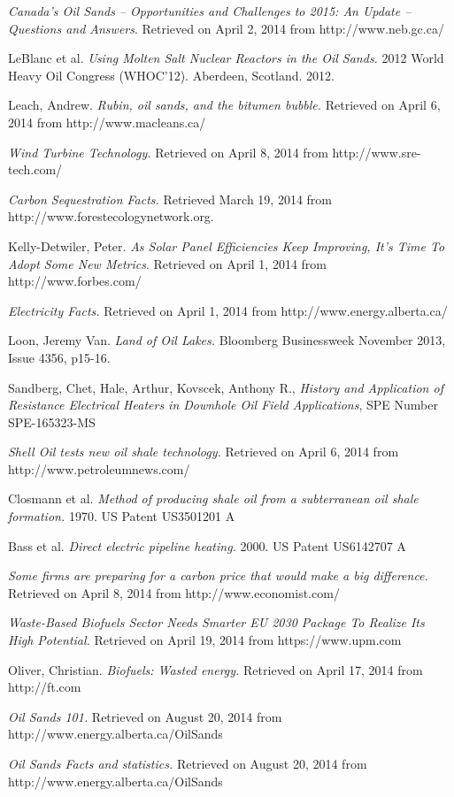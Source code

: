 \documentclass[12pt]{article}
\begin{document}
\begin{thebibliography}{9}
 \emph{Canada’s Oil Sands – Opportunities and Challenges to 2015: An Update – Questions and Answers}. Retrieved on April 2, 2014 from http://www.neb.gc.ca/ 

LeBlanc et al.  \emph{Using Molten Salt Nuclear Reactors in the Oil Sands.} 2012 World Heavy Oil Congress (WHOC’12). Aberdeen, Scotland. 2012. 

Leach, Andrew.  \emph{Rubin, oil sands, and the bitumen bubble.} Retrieved on April 6, 2014 from http://www.macleans.ca/ 

 \emph{Wind Turbine Technology.} Retrieved on April 8, 2014 from http://www.sre-tech.com/

 \emph{Carbon Sequestration Facts.} Retrieved March 19, 2014 from http://www.forestecologynetwork.org.

Kelly-Detwiler, Peter.  \emph{As Solar Panel Efficiencies Keep Improving, It's Time To Adopt Some New Metrics}. Retrieved on April 1, 2014 from http://www.forbes.com/ 

 \emph{Electricity Facts.} Retrieved on April 1, 2014 from http://www.energy.alberta.ca/ 

Loon, Jeremy Van.  \emph{ Land of Oil Lakes.} Bloomberg Businessweek November 2013, Issue 4356, p15-16.

Sandberg, Chet, Hale, Arthur, Kovscek, Anthony R.,  \emph{History and Application of Resistance Electrical Heaters in Downhole Oil Field Applications}, SPE Number SPE-165323-MS

 \emph{Shell Oil tests new oil shale technology.} Retrieved on April 6, 2014 from http://www.petroleumnews.com/ 

Closmann et al.  \emph{Method of producing shale oil from a subterranean oil shale formation.} 1970. US Patent US3501201 A

Bass et al.  \emph{Direct electric pipeline heating.} 2000. US Patent US6142707 A

 \emph{Some firms are preparing for a carbon price that would make a big difference.} Retrieved on April 8, 2014 from http://www.economist.com/

 \emph{Waste-Based Biofuels Sector Needs Smarter EU 2030 Package To Realize Its High Potential.} Retrieved on April 19, 2014 from https://www.upm.com

Oliver, Christian.  \emph{Biofuels: Wasted energy.} Retrieved on April 17, 2014 from http://ft.com

 \emph{Oil Sands 101.} Retrieved on August 20, 2014 from  http://www.energy.alberta.ca/OilSands

 \emph{Oil Sands Facts and statistics.} Retrieved on August 20, 2014 from http://www.energy.alberta.ca/OilSands
 
\end{thebibliography}
\end{document}
